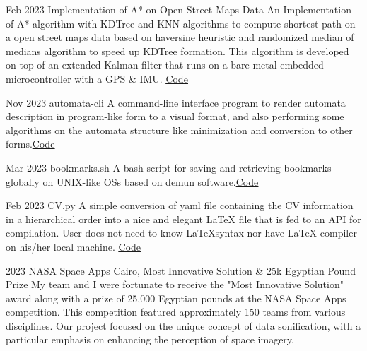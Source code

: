 \documentclass[hidelinks]{report}
\begin{document}
\vspace{2mm}


\entry
    {Feb 2023}
    {Implementation of A* on Open Street Maps Data }
    {}     
    {
       An Implementation of A* algorithm with KDTree and KNN algorithms to compute shortest path on a open street maps data based on haversine heuristic and randomized median of medians algorithm to speed up KDTree formation. This algorithm is developed on top of an extended Kalman filter that runs on a bare-metal embedded microcontroller with a GPS \& IMU. \href{\github/Astar-OSM}{\underline{Code}}
    }

\vspace{2mm}

    
\entry
    {Nov 2023}
    {automata-cli}
    {}
    {
    A command-line interface program to render automata description in program-like form to a visual format, and also performing some algorithms on the automata structure like minimization and conversion to other forms.\href{\github/automata-cli}{\underline{Code}}
    }

\entry
    {Mar 2023}
    {bookmarks.sh}
    {}
    {
      A bash script for saving and retrieving bookmarks globally
      on UNIX-like OSs  based on demun software.\href{\github/bookmark.sh}{\underline{Code}}
    }
    
\entry
    {Feb 2023}
    {CV.py}
    {}     
    {
      A simple conversion of yaml file containing the CV information in a hierarchical
      order into a nice and elegant LaTeX file that is fed to an API for compilation. User does
      not need to know \LaTeX syntax nor have LaTeX compiler on his/her local machine.
      \href{\github/CV.py}{\underline{Code}}
    }


\vspace{2mm}



\entry
    {2023}
    {NASA Space Apps Cairo,}  
    {Most Innovative Solution \& 25k Egyptian Pound Prize}
    {
      My team and I were fortunate to receive the "Most Innovative Solution" award along with a prize of 25,000 Egyptian pounds at the NASA Space Apps competition. This competition featured approximately 150 teams from various disciplines. Our project focused on the unique concept of data sonification, with a particular emphasis on enhancing the perception of space imagery.  
    }
    
\end{document}

